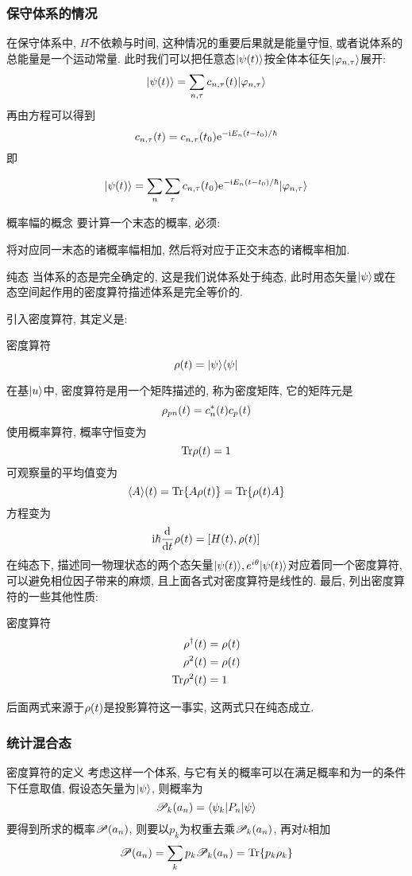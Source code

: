 \documentclass[UTF8]{ctexart}
\numberwithin{equation}{subsection}
\newcommand{\ntswd}[1]{
    \begin{center}
        \begin{noticeswd}{}{}
            #1
        \end{noticeswd}
    \end{center}
}
\begin{document}
\subsubsection*{保守体系的情况}
在保守体系中, $H$不依赖与时间, 这种情况的重要后果就是能量守恒, 或者说体系的总能量是一个运动常量. 此时我们可以把任意态$| {\psi(t)} \rangle$按全体本征矢$| {\varphi_{n,\tau}} \rangle$展开:
$$| {\psi(t)} \rangle=\sum_{n,\tau}c_{n,\tau}(t)| {\varphi_{n,\tau}} \rangle$$
再由\sch 方程可以得到
$$c_{n,\tau}(t)=c_{n,\tau}(t_0)\mathrm{e}^{-\mathrm{i} E_n(t-t_0)/\hbar}$$
即
\ntswd{\begin{equation}
    | {\psi(t)} \rangle=\sum_n\sum_\tau c_{n,\tau}(t_0)\mathrm{e}^{-\mathrm{i} E_n(t-t_0)/\hbar}| {\varphi_{n,\tau}} \rangle  \label{D54}
\end{equation}}
概率幅的概念
要计算一个末态的概率, 必须:
\ntswd{将对应同一末态的诸概率幅相加, 然后将对应于正交末态的诸概率相加. }
\begin{defi}{纯态}{}
当体系的态是完全确定的, 这是我们说体系处于纯态, 此时用态矢量$| {\psi} \rangle$或在态空间起作用的密度算符描述体系是完全等价的. 
\end{defi}

引入密度算符, 其定义是:
\begin{defi}{密度算符}{}
    $$\rho(t)=| {\psi} \rangle\langle {\psi} |$$
\end{defi}
在基$| {u} \rangle$中, 密度算符是用一个矩阵描述的, 称为密度矩阵, 它的矩阵元是
$$\rho_{pn}(t)=c_n^*(t)c_p(t)$$
使用概率算符, 概率守恒变为
$$\mathop{}\!\mathrm{Tr}\rho(t)=1$$
可观察量的平均值变为
$$\langle {A} \rangle(t)=\mathop{}\!\mathrm{Tr}\{A\rho(t)\}=\mathop{}\!\mathrm{Tr}\{\rho(t)A\}$$
\sch 方程变为
$$\mathrm{i}\hbar\frac{\mathrm{d}^{} }{\mathrm{d} t^{}}\rho(t)=[H(t),\rho(t)]$$
在纯态下, 描述同一物理状态的两个态矢量$| {\psi(t)} \rangle,e^{i\theta}| {\psi(t)} \rangle$对应着同一个密度算符, 可以避免相位因子带来的麻烦, 且上面各式对密度算符是线性的. 最后, 列出密度算符的一些其他性质:
\begin{xz}{密度算符}{}
$$\begin{aligned} 
    \rho^{\dagger}(t)&=\rho(t)\\
    \rho^2(t)&=\rho(t)\\
    \mathop{}\!\mathrm{Tr}\rho^2(t)&=1
 \end{aligned}$$
\end{xz}
后面两式来源于$\rho(t)$是投影算符这一事实, 这两式只在纯态成立.
\subsubsection*{统计混合态}
密度算符的定义
考虑这样一个体系, 与它有关的概率可以在满足概率和为一的条件下任意取值, 假设态矢量为$| {\psi} \rangle$, 则概率为
$$\mathscr{P}_k(a_n)=\langle {\psi_k|P_n|\psi} \rangle$$ 
要得到所求的概率$\mathscr{P}(a_n)$, 则要以$p_k$为权重去乘$\mathscr{P}_k(a_n)$, 再对$k$相加
$$\mathscr{P}(a_n)=\sum_kp_k\mathscr{P}_k(a_n)=\mathop{}\!\mathrm{Tr}\{p_k\rho_k\}$$
\end{document}
